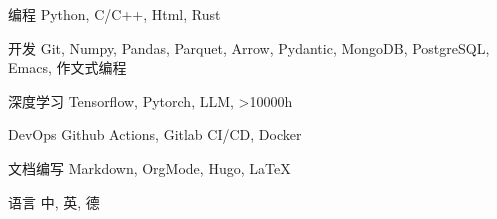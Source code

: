 \documentclass[../cv_cn.tex]{subfiles}
\begin{document}


\begin{cvskills}

  \cvskill
    {编程} %
    {Python, C/C++, Html, Rust} %

  \cvskill
    {开发} %
    {Git, Numpy, Pandas, Parquet, Arrow, Pydantic, MongoDB, PostgreSQL, Emacs, 作文式编程} %

  \cvskill
    {深度学习} %
    {Tensorflow, Pytorch, LLM, >10000h} %

  \cvskill
    {DevOps} %
    {Github Actions, Gitlab CI/CD, Docker} %

  \cvskill
    {文档编写} %
    {Markdown, OrgMode, Hugo, LaTeX} %

  \cvskill
    {语言} %
    {中, 英, 德} %

\end{cvskills}
\end{document}
